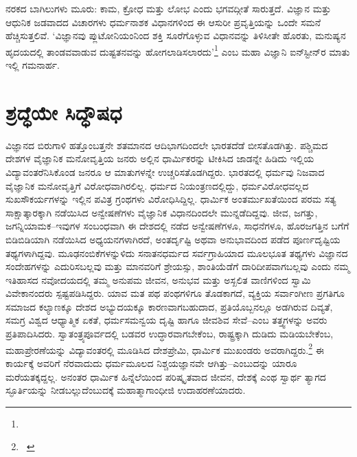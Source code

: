 ನರಕದ ಬಾಗಿಲುಗಳು ಮೂರು: ಕಾಮ, ಕ್ರೋಧ ಮತ್ತು ಲೋಭ ಎಂದು ಭಗವದ್ಗೀತೆ ಸಾರುತ್ತದೆ. ವಿಜ್ಞಾನ ಮತ್ತು ಆಧುನಿಕ ಜಡವಾದದ ವಿಚಾರಗಳು ಧರ್ಮನಾಶಕ ವಿಧಾನಗಳಿಂದ ಈ ಆಸುರೀ ಪ್ರವೃತ್ತಿಯನ್ನು ಒಂದೇ ಸಮನೆ ಹೆಚ್ಚಿಸುತ್ತಲಿವೆ. ‘ವಿಜ್ಞಾನವು ಪ್ಲುಟೋನಿಯಂನಿಂದ ಶಕ್ತಿ ಸೂರೆಗೊಳ್ಳುವ ವಿಧಾನವನ್ನು ತಿಳಿಸೀತೇ ಹೊರತು, ಮನುಷ್ಯನ ಹೃದಯದಲ್ಲಿ ತಾಂಡವವಾಡುವ ದುಷ್ಟತನವನ್ನು ಹೋಗಲಾಡಿಸಲಾರದು’\footnote{} ಎಂಬ ಮಹಾ ವಿಜ್ಞಾನಿ ಐನ್‍ಸ್ಟೀನ್​ರ ಮಾತು ಇಲ್ಲಿ ಗಮನಾರ್ಹ.


\section*{ಶ್ರದ್ಧೆಯೇ ಸಿದ್ಧೌಷಧ}


ವಿಜ್ಞಾನದ ಬಿರುಗಾಳಿ ಹತ್ತೊಂಬತ್ತನೇ ಶತಮಾನದ ಆದಿಭಾಗದಿಂದಲೇ ಭಾರತದೆಡೆ ಬೀಸ\-ತೊಡ\-ಗಿತ್ತು. ಪಶ್ಚಿಮದ ದೇಶಗಳ ವೈಜ್ಞಾನಿಕ ಮನೋವೃತ್ತಿಯ ಜನರು ಅಲ್ಲಿನ ಧಾರ್ಮಿಕರನ್ನು ಟೀಕಿಸಿದ ಜಾಡನ್ನೇ ಹಿಡಿದು ಇಲ್ಲಿಯ ವಿದ್ಯಾವಂತರೆನಿಸಿಕೊಂಡ ಜನರೂ ಆ ಮಾತುಗಳನ್ನೇ ಉಚ್ಚರಿಸತೊಡಗಿದ್ದರು. ಭಾರತದಲ್ಲಿ ಧರ್ಮವು ನಿಜವಾದ ವೈಜ್ಞಾನಿಕ ಮನೋವೃತ್ತಿಗೆ ವಿರೋಧ\-ವಾಗಿರಲಿಲ್ಲ. ಧರ್ಮದ ನಿಯಂತ್ರಣದಲ್ಲಿದ್ದು, ಧರ್ಮವಿರೋಧವಲ್ಲದ ಸುಖಸೌಕರ್ಯಗಳನ್ನು ಇಲ್ಲಿನ ಪವಿತ್ರ ಗ್ರಂಥಗಳು ವಿರೋಧಿಸಿದ್ದಿಲ್ಲ. ಧಾರ್ಮಿಕ ಅಂತರ್ಮುಖತೆಯಿಂದ ಪರಮ ಸತ್ಯ ಸಾಕ್ಷಾತ್ಕಾರಕ್ಕಾಗಿ ನಡೆಯಿಸಿದ ಅನ್ವೇಷಣೆಗಳು ವೈಜ್ಞಾನಿಕ ವಿಧಾನದಿಂದಲೇ ಮುನ್ನಡೆದಿದ್ದವು. ಜೀವ, ಜಗತ್ತು, ಜಗನ್ನಿಯಾಮಕ–ಇವುಗಳ ಸಂಬಂಧವಾಗಿ ಈ ದೇಶದಲ್ಲಿ ನಡೆದ ಅನ್ವೇಷಣೆಗಳೂ, ಸಾಧನೆಗಳೂ, ಹೊರಜಗತ್ತಿನ ಬಗೆಗೆ ಬಿಡಿಬಿಡಿಯಾಗಿ ನಡೆಯಿಸಿದ ಅಧ್ಯಯನಗಳಾಗಿರದೆ, ಅಂತರ್ದೃಷ್ಟಿ ಅಥವಾ ಅನುಭಾವದಿಂದ ಪಡೆದ ಪೂರ್ಣದೃಷ್ಟಿಯ ತಥ್ಯಗಳಾಗಿದ್ದವು. ಮೂಢ\-ನಂಬಿಕೆಗಳನ್ನುಳಿದು ಸನಾತನಧರ್ಮದ ಸರ್ವಗ್ರಾಹಿಯಾದ ಮೂಲಭೂತ ತಥ್ಯಗಳು ವಿಜ್ಞಾನದ ಸಂದೇಹಗಳನ್ನು ಎದುರಿಸಬಲ್ಲವು ಮತ್ತು ಮಾನವರಿಗೆ ಶ್ರೇಯಸ್ಸು, ಶಾಂತಿಯೆಡೆಗೆ ದಾರಿದೀಪ\-ವಾಗ\-ಬಲ್ಲವು ಎಂದು ನಮ್ಮ ಇತಿಹಾಸದ ನವೋದಯದಲ್ಲಿ ತಮ್ಮ ಅನುಪಮ ಜೀವನ, ಅನುಭವ ಮತ್ತು ಅಸ್ಖಲಿತ ವಾಣಿಗಳಿಂದ ಸ್ವಾಮಿ ವಿವೇಕಾನಂದರು ಸ್ಪಷ್ಟಪಡಿಸಿದ್ದರು. ಯಾವ ಮತ ಪಥ ಪಂಥಗಳಿಗೂ ತೊಡಕಾಗದೆ, ವ್ಯಕ್ತಿಯ ಸರ್ವಾಂಗೀಣ ಪ್ರಗತಿಗೂ ಸಮಾಜದ ಕಲ್ಯಾಣಕ್ಕೂ ದೇಶದ ಅಭ್ಯುದಯಕ್ಕೂ ಕಾರಣವಾಗಬಹುದಾದ, ಪ್ರತಿಯೊಬ್ಬನಲ್ಲೂ ಅಡಗಿರುವ ದಿವ್ಯತೆ, ಸಮಗ್ರ ವಿಶ್ವದ ಆಧ್ಯಾತ್ಮಿಕ ಏಕತೆ, ಧರ್ಮಸಮನ್ವಯ ದೃಷ್ಟಿ ಹಾಗೂ ಜೀವಶಿವ ಸೇವೆ–ಎಂಬ ತತ್ತ್ವಗಳನ್ನು ಅವರು ಪ್ರತಿಪಾದಿಸಿದರು. ಸ್ವಾತಂತ್ರ್ಯಪೂರ್ವದಲ್ಲಿ ಬಡವರ ಉದ್ಧಾರವಾಗಬೇಕೆಂಬ, ರಾಷ್ಟ್ರಕ್ಕಾಗಿ ದುಡಿದು ಮಡಿಯಬೇಕೆಂಬ, ಮಹಾಪ್ರೇರಣೆಯನ್ನು ವಿದ್ಯಾವಂತರಲ್ಲಿ ಮೂಡಿಸಿದ ದೇಶಪ್ರೇಮಿ, ಧಾರ್ಮಿಕ ಮುಖಂಡರು ಅವರಾಗಿದ್ದರು.\footnote{

~\hfill{}} ಈ ಕಾರ್ಯಕ್ಕೆ ಅವರಿಗೆ ನೆರವಾದುದು ಧರ್ಮಮೂಲದ ನಿಶ್ಚಯಜ್ಞಾನವೇ ಆಗಿತ್ತು–ಎಂಬುದನ್ನು ಯಾರೂ ಮರೆಯತಕ್ಕದ್ದಲ್ಲ. ಅನಂತರ ಧಾರ್ಮಿಕ ಹಿನ್ನೆಲೆಯಿಂದ ಪರಿಷ್ಕೃತವಾದ ಜೀವನ, ದೇಶಕ್ಕೆ ಎಂಥ ಸ್ವಾರ್ಥ ತ್ಯಾಗದ ಸ್ಫೂರ್ತಿಯನ್ನು ನೀಡಬಲ್ಲುದೆಂಬುದಕ್ಕೆ ಮಹಾತ್ಮಾಗಾಂಧೀಜಿ ಉದಾಹರಣೆಯಾದರು.

